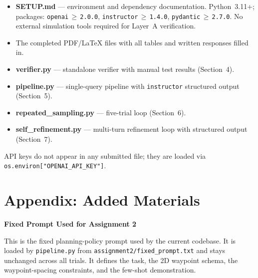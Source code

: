 \documentclass[12pt]{article}
\begin{document}
\begin{itemize}[label=$\boxtimes$]
  \item \textbf{SETUP.md} --- environment and dependency documentation. Python~3.11+;
    packages: \texttt{openai$\,\geq\,$2.0.0}, \texttt{instructor$\,\geq\,$1.4.0},
    \texttt{pydantic$\,\geq\,$2.7.0}. No external simulation
    tools required for Layer~A verification.
  \item The completed PDF/LaTeX files with all tables and written responses filled in.
  \item \textbf{verifier.py} --- standalone verifier with manual test results (Section~4).
  \item \textbf{pipeline.py} --- single-query pipeline with \texttt{instructor} structured
    output (Section~5).
  \item \textbf{repeated\_sampling.py} --- five-trial loop (Section~6).
  \item \textbf{self\_refinement.py} --- multi-turn refinement loop with structured output
    (Section~7).
\end{itemize}

\noindent API keys do not appear in any submitted file; they are loaded via
\texttt{os.environ["OPENAI\_API\_KEY"]}.

\newpage
\section*{Appendix: Added Materials}

\noindent\textbf{Fixed Prompt Used for Assignment 2}

\medskip
\noindent This is the fixed planning-policy prompt used by the current codebase. It is loaded by
\texttt{pipeline.py} from \texttt{assignment2/fixed\_prompt.txt} and stays unchanged across all
trials. It defines the task, the 2D waypoint schema, the waypoint-spacing constraints, and the
few-shot demonstration.
\end{document}
